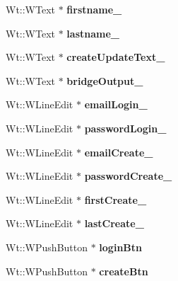 \begin{DoxyCompactItemize}
Wt\+::\+W\+Text $\ast$ {\bfseries firstname\+\_\+}
\item 
\mbox{\label{class_home_page_a06863d54dbc0e8e59568de8e48aa16e4}} 
Wt\+::\+W\+Text $\ast$ {\bfseries lastname\+\_\+}
\item 
\mbox{\label{class_home_page_abb09080e7fa8d8e67c3f7b32b36913c6}} 
Wt\+::\+W\+Text $\ast$ {\bfseries create\+Update\+Text\+\_\+}
\item 
\mbox{\label{class_home_page_a4b64b141092c4301da9aefcec1972901}} 
Wt\+::\+W\+Text $\ast$ {\bfseries bridge\+Output\+\_\+}
\item 
\mbox{\label{class_home_page_a1a83db80bc2079a3c136b921d631d092}} 
Wt\+::\+W\+Line\+Edit $\ast$ {\bfseries email\+Login\+\_\+}
\item 
\mbox{\label{class_home_page_aeb262c5638972913967baf59af4ac7fc}} 
Wt\+::\+W\+Line\+Edit $\ast$ {\bfseries password\+Login\+\_\+}
\item 
\mbox{\label{class_home_page_a88e1c17d22e0308b1600cbd08a6d4755}} 
Wt\+::\+W\+Line\+Edit $\ast$ {\bfseries email\+Create\+\_\+}
\item 
\mbox{\label{class_home_page_a22bd565ef1beace353181e867d21b427}} 
Wt\+::\+W\+Line\+Edit $\ast$ {\bfseries password\+Create\+\_\+}
\item 
\mbox{\label{class_home_page_af28999a99f5ae23b313c0a97cd6f69a2}} 
Wt\+::\+W\+Line\+Edit $\ast$ {\bfseries first\+Create\+\_\+}
\item 
\mbox{\label{class_home_page_a219cdf3b4fa7939d9e513d50e413e1d9}} 
Wt\+::\+W\+Line\+Edit $\ast$ {\bfseries last\+Create\+\_\+}
\item 
\mbox{\label{class_home_page_a34949a74a5624d39794e9a36fdc3e3a9}} 
Wt\+::\+W\+Push\+Button $\ast$ {\bfseries login\+Btn}
\item 
\mbox{\label{class_home_page_a44aea27c2144dc79e5cd874f1535e3c2}} 
Wt\+::\+W\+Push\+Button $\ast$ {\bfseries create\+Btn}

\end{DoxyCompactItemize}
